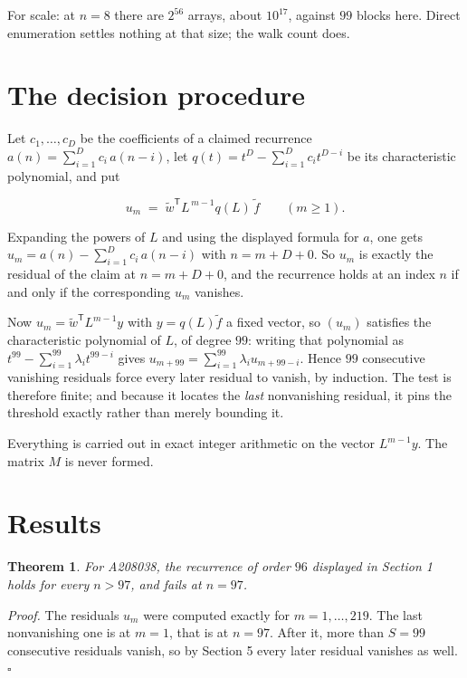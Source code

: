 \documentclass[11pt]{article}
\newtheorem{theorem}{Theorem}
\theoremstyle{definition}
\begin{document}
For scale: at $n = 8$ there are $2^{56}$ arrays, about $10^{17}$, against $99$ blocks here. Direct enumeration settles nothing at that size; the walk count does.

\section{The decision procedure}

Let $c_1,\dots,c_D$ be the coefficients of a claimed recurrence $a(n) = \sum_{i=1}^{D} c_i\,a(n-i)$, let $q(t) = t^{D} - \sum_{i=1}^{D} c_i t^{D-i}$ be its characteristic polynomial, and put

\[u_m \;=\; \tilde w^{\mathsf T} L^{\,m-1} q(L)\,\tilde f \qquad (m \ge 1).\]

Expanding the powers of $L$ and using the displayed formula for $a$, one gets $u_m = a(n) - \sum_{i=1}^{D} c_i\,a(n-i)$ with $n = m + D + 0$. So $u_m$ is exactly the residual of the claim at $n = m + D + 0$, and the recurrence holds at an index $n$ if and only if the corresponding $u_m$ vanishes.

Now $u_m = \tilde w^{\mathsf T} L^{m-1} y$ with $y = q(L)\tilde f$ a fixed vector, so $(u_m)$ satisfies the characteristic polynomial of $L$, of degree $99$: writing that polynomial as $t^{99} - \sum_{i=1}^{99} \lambda_i t^{99-i}$ gives $u_{m+99} = \sum_{i=1}^{99} \lambda_i u_{m+99-i}$. Hence $99$ consecutive vanishing residuals force every later residual to vanish, by induction. The test is therefore finite; and because it locates the {\itshape last} nonvanishing residual, it pins the threshold exactly rather than merely bounding it.

Everything is carried out in exact integer arithmetic on the vector $L^{m-1}y$. The matrix $M$ is never formed.

\section{Results}

\begin{theorem} For A208038, the recurrence of order $96$ displayed in Section 1 holds for every $n > 97$, and fails at $n = 97$.\end{theorem}

{\itshape Proof.} The residuals $u_m$ were computed exactly for $m = 1,\dots,219$. The last nonvanishing one is at $m = 1$, that is at $n = 97$. After it, more than $S = 99$ consecutive residuals vanish, so by Section 5 every later residual vanishes as well. $\square$
\end{document}
